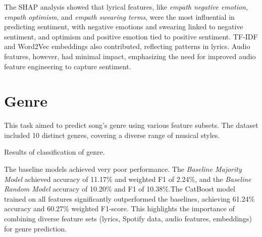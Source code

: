 The SHAP analysis showed that lyrical features, like \textit{empath negative
emotion}, \textit{empath optimism}, and \textit{empath swearing terms}, were
the most influential in predicting sentiment, with negative emotions and
swearing linked to negative sentiment, and optimism and positive emotion tied
to positive sentiment. TF-IDF and Word2Vec embeddings also contributed,
reflecting patterns in lyrics. Audio features, however, had minimal impact,
emphasizing the need for improved audio feature engineering to capture
sentiment.

\section{Genre}
\label{sec:genre}

This task aimed to predict song's genre using  various  feature subsets. The
dataset included 10 distinct genres, covering a diverse range of musical
styles.

\begin{table}[H]
\centering
\caption{Results of classification of genre.}
\end{table}

The baseline models achieved very poor performance. The \textit{Baseline
Majority Model} achieved accuracy of 11.17\% and weighted F1 of 2.24\%, and the
\textit{Baseline Random Model} accuracy of 10.20\% and F1 of 10.38\%.The
CatBoost model trained on all features significantly outperformed the
baselines, achieving 61.24\% accuracy and 60.27\% weighted F1-score. This
highlights the importance of combining diverse feature sets (lyrics, Spotify
data, audio features, embeddings) for genre prediction.

